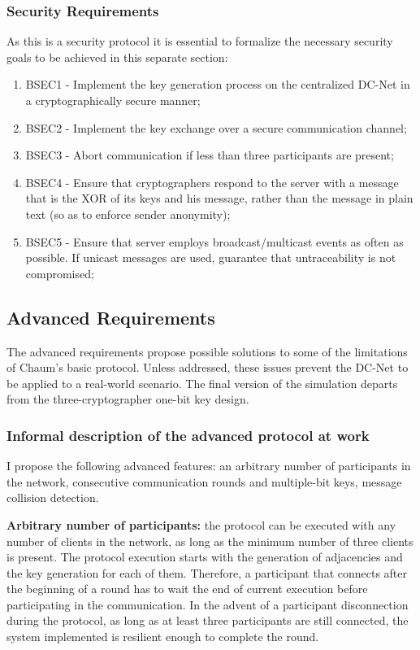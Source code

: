 \subsubsection{Security Requirements}
As this is a security protocol it is essential to formalize the necessary security goals to be achieved in this separate section:
\begin{enumerate}
    \item BSEC1 - Implement the key generation process on the centralized DC-Net in a cryptographically secure manner;
    \item BSEC2 - Implement the key exchange over a secure communication channel;
    \item BSEC3 - Abort communication if less than three participants are present;
    \item BSEC4 - Ensure that cryptographers respond to the server with a message that is the XOR of its keys and his message, rather than the message in plain text (so as to enforce sender anonymity);
    \item BSEC5 - Ensure that server employs broadcast/multicast events as often as possible. If unicast messages are used, guarantee that untraceability is not compromised;
\end{enumerate}

\subsection{Advanced Requirements} \label{sec:advancedReq}
The advanced requirements propose possible solutions to some of the limitations of Chaum's basic protocol. Unless addressed, these issues prevent the DC-Net to be applied to a real-world scenario. The final version of the simulation departs from the three-cryptographer one-bit key design. \newline

\subsubsection{Informal description of the advanced protocol at work}
I propose the following advanced features: an arbitrary number of participants in the network, consecutive communication rounds and multiple-bit keys, message collision detection. \newline

\textbf{Arbitrary number of participants:} the protocol can be executed with any number of clients in the network, as long as the minimum number of three clients is present. The protocol execution starts with the generation of adjacencies and the key generation for each of them. Therefore, a participant that connects after the beginning of a round has to wait the end of current execution before participating in the communication. In the advent of a participant disconnection during the protocol, as long as at least three participants are still connected, the system implemented is resilient enough to complete the round. \newline

